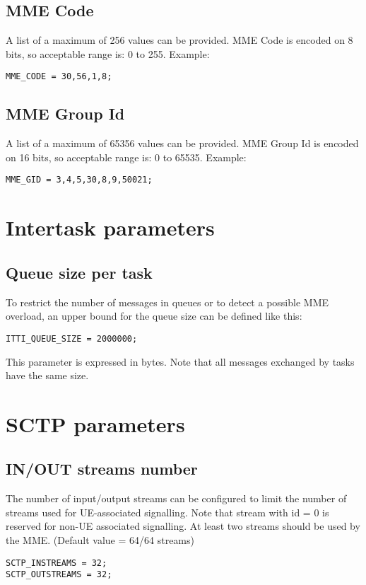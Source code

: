 \documentclass[a4paper,oneside]{report}
\begin{document}
\subsection{MME Code}
A list of a maximum of 256 values can be provided.
MME Code is encoded on 8 bits,
so acceptable range is: 0 to 255.
Example:
\begin{lstlisting}
MME_CODE = 30,56,1,8;
\end{lstlisting}

\subsection{MME Group Id}
A list of a maximum of 65356 values can be provided.
MME Group Id is encoded on 16 bits,
so acceptable range is: 0 to 65535.
Example:
\begin{lstlisting}
MME_GID = 3,4,5,30,8,9,50021;
\end{lstlisting}

\section{Intertask parameters}
\subsection{Queue size per task}
To restrict the number of messages in queues or to detect a possible MME overload,
an upper bound for the queue size can be defined like this:
\begin{lstlisting}
ITTI_QUEUE_SIZE = 2000000;
\end{lstlisting}
This parameter is expressed in bytes. Note that all messages exchanged by tasks
have the same size.

\section{SCTP parameters}
\subsection{IN/OUT streams number}
The number of input/output streams can be configured to limit the number of streams
used for UE-associated signalling. Note that stream with id = 0 is reserved for
non-UE associated signalling. At least two streams should be used by the MME.
(Default value = 64/64 streams)
\begin{lstlisting}
SCTP_INSTREAMS = 32;
SCTP_OUTSTREAMS = 32;
\end{lstlisting}
\end{document}

